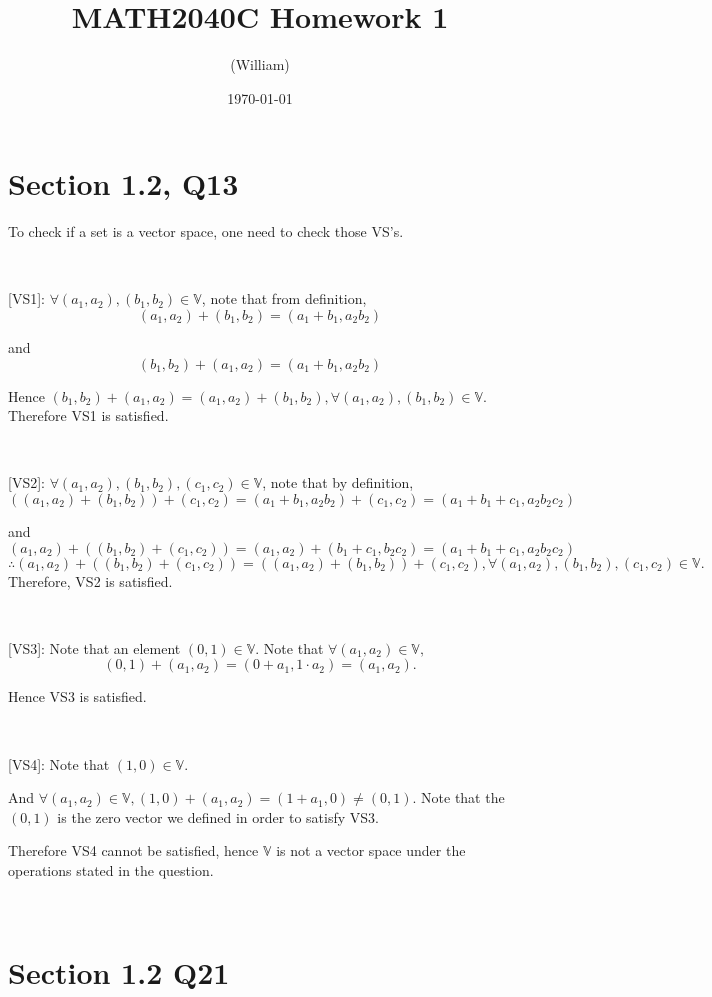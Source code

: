 \documentclass[12pt]{article}%
\begin{document}
\title{MATH2040C Homework 1}
\author{(William)}
\date{\today}
\maketitle

\section{Section 1.2, Q13}

To check if a set is a vector space, one need to check those VS's. 

~\

[VS1]: $\forall (a_1,a_2),(b_1,b_2) \in \mathbb{V}$, note that from definition, $$(a_1,a_2)+(b_1,b_2)=(a_1+b_1,a_2b_2)$$ 

and $$(b_1,b_2)+(a_1,a_2)=(a_1+b_1,a_2b_2)$$

Hence $(b_1,b_2)+(a_1,a_2) = (a_1,a_2)+(b_1,b_2), \forall (a_1,a_2),(b_1,b_2) \in \mathbb{V}.$ Therefore VS1 is satisfied.

~\

[VS2]: $\forall (a_1,a_2),(b_1,b_2),(c_1,c_2) \in \mathbb{V}$, note that by definition, $$((a_1,a_2)+(b_1,b_2))+(c_1,c_2)=(a_1+b_1,a_2b_2)+(c_1,c_2)=(a_1+b_1+c_1,a_2b_2c_2)$$

and $$(a_1,a_2)+((b_1,b_2)+(c_1,c_2)) = (a_1,a_2)+(b_1+c_1,b_2c_2)=(a_1+b_1+c_1,a_2b_2c_2)$$ $$\therefore (a_1,a_2)+((b_1,b_2)+(c_1,c_2)) = ((a_1,a_2)+(b_1,b_2))+(c_1,c_2), \forall (a_1,a_2),(b_1,b_2),(c_1,c_2) \in \mathbb{V}.$$ Therefore, VS2 is satisfied.

~\

[VS3]: Note that an element $(0,1)\in \mathbb{V}.$ Note that $\forall (a_1,a_2)\in \mathbb{V},$ $$(0,1)+(a_1,a_2)=(0+a_1,1\cdot a_2) = (a_1,a_2).$$

Hence VS3 is satisfied. 

~\

[VS4]: Note that $(1,0)\in \mathbb{V}.$ 

And $\forall (a_1,a_2)\in \mathbb{V}, (1,0)+(a_1,a_2)=(1+a_1,0)\neq (0,1).$ Note that the $(0,1)$ is the zero vector we defined in order to satisfy VS3.

Therefore VS4 cannot be satisfied, hence $\mathbb{V}$ is not a vector space under the operations stated in the question.

~\

\section{Section 1.2 Q21}
\end{document}
